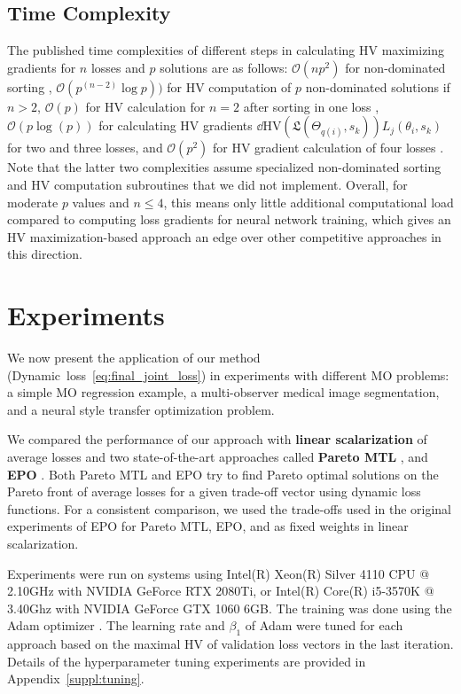 \subsection{Time Complexity}
The published time complexities of different steps in calculating HV maximizing gradients for $n$ losses and $p$ solutions are as follows: $\mathcal{O}(np^{2})$ for non-dominated sorting \citep{deb2002fast}, $\mathcal{O}(p^{(n-2)}\log{p}))$ for HV computation of $p$ non-dominated solutions if $n>2$, $\mathcal{O}(p)$ for HV calculation for $n=2$ after sorting in one loss \citep{fonseca2006improved}, $\mathcal{O}(p\log(p))$ for calculating HV gradients 
$\dd{\mathrm{HV}\left(\mathfrak{L}(\Theta_{q(i)},s_{k}) \right)}{L_{j}(\theta_{i},s_{k})}$
 for two and three losses, and $\mathcal{O}(p^{2})$ for HV gradient calculation of four losses \citep{emmerich2014time}. Note that the latter two complexities assume specialized non-dominated sorting and HV computation subroutines that we did not implement. Overall, for moderate $p$ values and $n\leq4$, this means only little additional computational load compared to computing loss gradients for neural network training, which gives an HV maximization-based approach an edge over other competitive approaches in this direction.\section{Experiments}
\label{sec:experiments}
We now present the application of our method (Dynamic~loss~\eqref{eq:final_joint_loss}) in experiments with different MO problems: a simple MO regression example, a multi-observer medical image segmentation, and a neural style transfer optimization problem.  

We compared the performance of our approach with \textbf{linear scalarization} of average losses and two state-of-the-art approaches called \textbf{Pareto MTL} \citep{lin2019paretomtl}, and \textbf{EPO} \citep{mahapatra2020multi}. Both Pareto MTL and EPO try to find Pareto optimal solutions on the Pareto front of average losses for a given trade-off vector using dynamic loss functions. For a consistent comparison, we used the trade-offs used in the original experiments of EPO for Pareto MTL, EPO, and as fixed weights in linear scalarization.

Experiments were run on systems using Intel(R) Xeon(R) Silver 4110 CPU @ 2.10GHz with NVIDIA GeForce RTX 2080Ti, or Intel(R) Core(R) i5-3570K @ 3.40Ghz with NVIDIA GeForce GTX 1060 6GB. The training was done using the Adam optimizer \citep{kingma2014adam}. The learning rate and $\beta_{1}$ of Adam were tuned for each approach based on the maximal HV of validation loss vectors in the last iteration. Details of the hyperparameter tuning experiments are provided in Appendix~\ref{suppl:tuning}.

